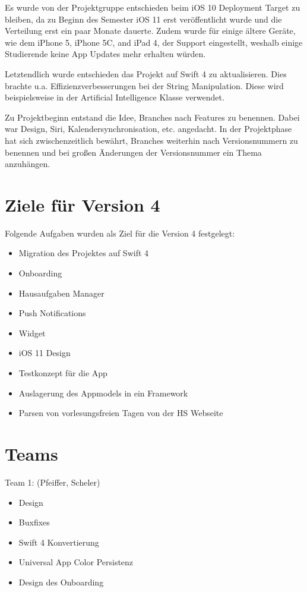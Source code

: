 Es wurde von der Projektgruppe entschieden beim iOS 10 Deployment Target zu bleiben, da zu Beginn des Semester iOS 11 erst veröffentlicht wurde und die Verteilung erst ein paar Monate dauerte. Zudem wurde für einige ältere Geräte, wie dem iPhone 5, iPhone 5C, and iPad 4, der Support eingestellt, weshalb einige Studierende keine App Updates mehr erhalten würden.

Letztendlich wurde entschieden das Projekt auf Swift 4 zu aktualisieren. Dies brachte u.a. Effizienzverbesserungen bei der String Manipulation. Diese wird beispielsweise in der Artificial Intelligence Klasse verwendet.

Zu Projektbeginn entstand die Idee, Branches nach Features zu benennen. Dabei war Design, Siri, Kalendersynchronisation, etc. angedacht. In der Projektphase hat sich zwischenzeitlich bewährt, Branches weiterhin nach Versionsnummern zu benennen und bei großen Änderungen der Versionsnummer ein Thema anzuhängen.


\section{Ziele für Version 4}
Folgende Aufgaben wurden als Ziel für die Version 4 festgelegt:
\begin{itemize}
\item Migration des Projektes auf Swift 4
\item Onboarding
\item Hausaufgaben Manager
\item Push Notifications
\item Widget
\item iOS 11 Design
\item Testkonzept für die App
\item Auslagerung des Appmodels in ein Framework
\item Parsen von vorlesungsfreien Tagen von der HS Webseite
\end{itemize}

\newpage
\section{Teams}

Team 1: (Pfeiffer, Scheler)
\begin{itemize}
\item Design
\item Buxfixes
\item Swift 4 Konvertierung
\item Universal App Color Persistenz
\item Design des Onboarding
\end{itemize}



